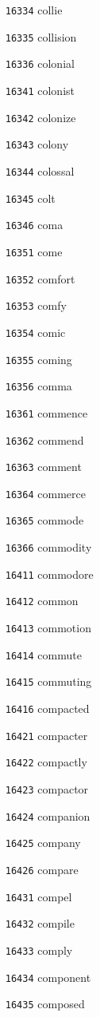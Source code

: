 \documentclass[twoside,11pt]{article}
\begin{document}
\begin{multicols}{5}
\begin{enumerate}
\item[\texttt{16334}] collie
\item[\texttt{16335}] collision
\item[\texttt{16336}] colonial
\item[\texttt{16341}] colonist
\item[\texttt{16342}] colonize
\item[\texttt{16343}] colony
\item[\texttt{16344}] colossal
\item[\texttt{16345}] colt
\item[\texttt{16346}] coma
\item[\texttt{16351}] come
\item[\texttt{16352}] comfort
\item[\texttt{16353}] comfy
\item[\texttt{16354}] comic
\item[\texttt{16355}] coming
\item[\texttt{16356}] comma
\item[\texttt{16361}] commence
\item[\texttt{16362}] commend
\item[\texttt{16363}] comment
\item[\texttt{16364}] commerce
\item[\texttt{16365}] commode
\item[\texttt{16366}] commodity
\item[\texttt{16411}] commodore
\item[\texttt{16412}] common
\item[\texttt{16413}] commotion
\item[\texttt{16414}] commute
\item[\texttt{16415}] commuting
\item[\texttt{16416}] compacted
\item[\texttt{16421}] compacter
\item[\texttt{16422}] compactly
\item[\texttt{16423}] compactor
\item[\texttt{16424}] companion
\item[\texttt{16425}] company
\item[\texttt{16426}] compare
\item[\texttt{16431}] compel
\item[\texttt{16432}] compile
\item[\texttt{16433}] comply
\item[\texttt{16434}] component
\item[\texttt{16435}] composed

\end{enumerate}
\end{multicols}
\end{document}
